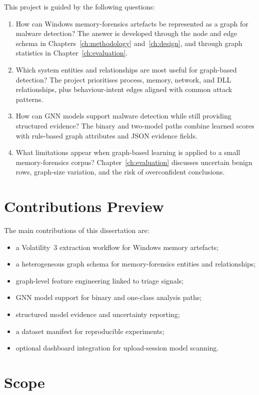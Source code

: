 This project is guided by the following questions:

\begin{enumerate}
\item How can Windows memory-forensics artefacts be represented as a graph for malware detection? The answer is developed through the node and edge schema in Chapters~\ref{ch:methodology} and~\ref{ch:design}, and through graph statistics in Chapter~\ref{ch:evaluation}.
\item Which system entities and relationships are most useful for graph-based detection? The project prioritises process, memory, network, and DLL relationships, plus behaviour-intent edges aligned with common attack patterns.
\item How can GNN models support malware detection while still providing structured evidence? The binary and two-model paths combine learned scores with rule-based graph attributes and JSON evidence fields.
\item What limitations appear when graph-based learning is applied to a small memory-forensics corpus? Chapter~\ref{ch:evaluation} discusses uncertain benign rows, graph-size variation, and the risk of overconfident conclusions.
\end{enumerate}

\section{Contributions Preview}

The main contributions of this dissertation are:

\begin{itemize}
\item a Volatility~3 extraction workflow for Windows memory artefacts;
\item a heterogeneous graph schema for memory-forensics entities and relationships;
\item graph-level feature engineering linked to triage signals;
\item GNN model support for binary and one-class analysis paths;
\item structured model evidence and uncertainty reporting;
\item a dataset manifest for reproducible experiments;
\item optional dashboard integration for upload-session model scanning.
\end{itemize}

\section{Scope}

